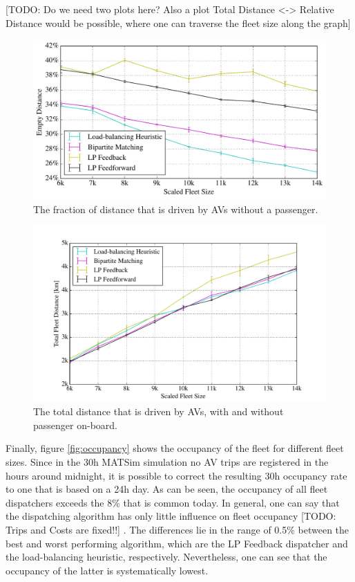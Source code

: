 [TODO: Do we need two plots here? Also a plot Total Distance <-> Relative Distance
would be possible, where one can traverse the fleet size along the graph]

\begin{figure}
\includegraphics[width=1.0\textwidth]{figures/empty_rides.pdf}
\caption{The fraction of distance that is driven by AVs without a passenger.}
\label{fig:empty_rides}
\end{figure}

\begin{figure}
\includegraphics[width=1.0\textwidth]{figures/total_distance.pdf}
\caption{The total distance that is driven by AVs, with and without passenger on-board.}
\label{fig:total_distance}
\end{figure}

Finally, figure \ref{fig:occupancy} shows the occupancy of the fleet for different fleet sizes. Since in the 30h MATSim simulation no AV trips are registered in the hours around midnight, it is possible to correct the resulting 30h occupancy rate to one that is based on a 24h day. As can be seen, the occupancy of all fleet dispatchers exceeds the 8\% that is common today. In general, one can say that the dispatching algorithm has only little influence on fleet occupancy
 [TODO: Trips and Costs are fixed!!]
. The differences lie in the range of 0.5\% between the best and worst performing algorithm, which are the LP Feedback dispatcher and the load-balancing heuristic, respectively. Nevertheless, one can see that the occupancy of the latter is systematically lowest.

